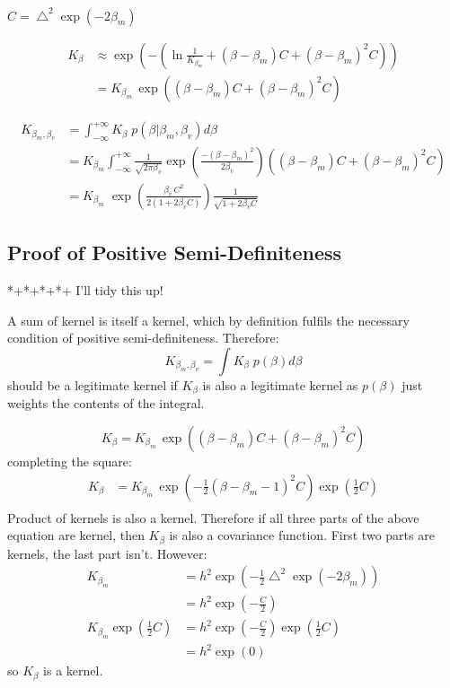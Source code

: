 \documentclass{article}
\begin{document}
$C = \bigtriangleup^2 \exp(-2\beta_m)$

\begin{align}
K_\beta &\approx \exp \left(-\left( \ln \frac{1}{K_{\beta_m}} + (\beta-\beta_m) C + (\beta-\beta_m)^2 C \right)   \right)\\
&= K_{\beta_m} \, \exp \left( (\beta-\beta_m) C + (\beta-\beta_m)^2 C \right)
\end{align}

\begin{align}
K_{\beta_m,\beta_v} &= \int_{-\infty}^{+\infty} K_\beta \; p(\beta|\beta_m,\beta_v) d\beta \\
&= K_{\beta_m}\int_{-\infty}^{+\infty} \frac{1}{\sqrt{2 \pi \beta_v}} \exp \left( \frac{ -(\beta - \beta_m)^2}{2\beta_v} \right) \left( (\beta-\beta_m) C + (\beta-\beta_m)^2 C \right) \\
&= K_{\beta_m} \; \exp \left( \frac{\beta_v\, C^2}{2(1+2\beta_v C)} \right) \frac{1}{\sqrt{1+ 2\beta_v C}}
\end{align}








\subsection{Proof of Positive Semi-Definiteness}

*+*+*+*+ I'll tidy this up!

A sum of kernel is itself a kernel, which by definition fulfils the necessary condition of positive semi-definiteness. Therefore:
\begin{equation}
K_{\beta_m,\beta_v} = \int K_\beta \;p(\beta)d\beta
\end{equation}
should be a legitimate kernel if $K_\beta$ is also a legitimate kernel as $p(\beta)$ just weights the contents of the integral.

\begin{equation}
K_\beta = K_{\beta_m} \, \exp \left( (\beta-\beta_m) C + (\beta-\beta_m)^2 C \right)
\end{equation}
completing the square:
\begin{align}
K_\beta &= K_{\beta_m} \,  \exp \left(  -\frac{1}{2} (\beta - \beta_m - 1) ^ 2C   \right) \exp \left( \frac{1}{2}C \right) \\
\end{align}
Product of kernels is also a kernel. Therefore if all three parts of the above equation are kernel, then $K_\beta$ is also a covariance function. First two parts are kernels, the last part isn't. However:
\begin{align}
K_{\beta_m} &= h^2 \exp\left( -\frac{1}{2}\bigtriangleup^2 \exp(-2\beta_m) \right)\\
&= h^2 \exp\left( -\frac{C}{2} \right)\\
K_{\beta_m} \exp \left( \frac{1}{2}C \right) &= h^2 \exp\left( -\frac{C}{2} \right) \exp \left( \frac{1}{2}C \right) \\
&= h^2 \exp\left( 0 \right)
\end{align}
so $K_\beta$ is a kernel.
\end{document}
